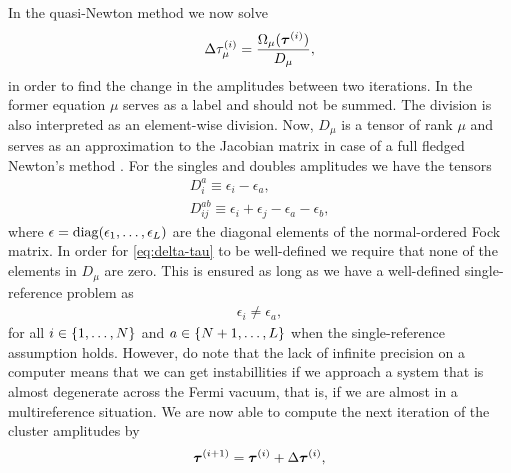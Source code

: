             In the quasi-Newton method we now solve \cite{bartlett-purvis,
            helgaker-molecular}
            \begin{align}
                \Delta \tau^{(i)}_{\mu}
                = \frac{\Omega_{\mu}(\boldsymbol{\tau}^{(i)})}{
                    D_{\mu}
                },
                \label{eq:delta-tau}
            \end{align}
            in order to find the change in the amplitudes between two
            iterations.
            In the former equation $\mu$ serves as a label and should not be
            summed.
            The division is also interpreted as an element-wise division.
            Now, $D_{\mu}$ is a tensor of rank $\mu$ and serves as an
            approximation to the Jacobian matrix in case of a full fledged
            Newton's method \cite{helgaker-molecular}.
            For the singles and doubles amplitudes we have the tensors
            \begin{gather}
                D^{a}_{i} \equiv \epsilon_i - \epsilon_a, \\
                D^{ab}_{ij} \equiv \epsilon_i + \epsilon_j
                - \epsilon_a - \epsilon_b,
            \end{gather}
            where $\epsilon = \operatorname{diag}(\epsilon_1, \dots, \epsilon_L)$ are the
            diagonal elements of the normal-ordered Fock matrix.
            In order for \autoref{eq:delta-tau} to be well-defined we require
            that none of the elements in $D_{\mu}$ are zero.
            This is ensured as long as we have a well-defined single-reference
            problem as
            \begin{align}
                \epsilon_i \neq \epsilon_a,
            \end{align}
            for all $i \in \left\{ 1, \dots, N \right\}$ and $a \in \left\{ N + 1, \dots,
            L \right\}$ when the single-reference assumption holds.
            However, do note that the lack of infinite precision on a computer
            means that we can get instabillities if we approach a system that is
            almost degenerate across the Fermi vacuum, that is, if we are almost
            in a multireference situation.
            We are now able to compute the next iteration of the cluster
            amplitudes by
            \begin{align}
                \boldsymbol{\tau}^{(i + 1)}
                = \boldsymbol{\tau}^{(i)}
                + \Delta \boldsymbol{\tau}^{(i)},
            \end{align}
